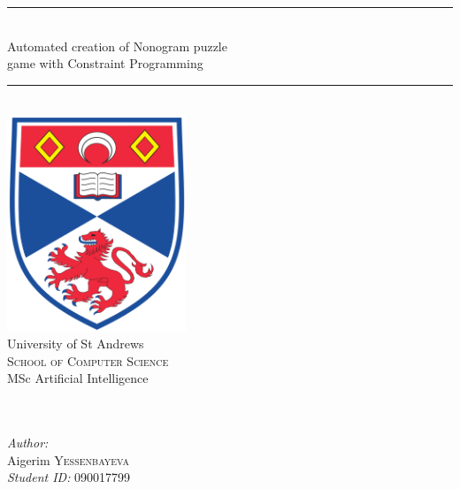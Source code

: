 \begin{titlingpage}
\newcommand{\HRule}{\rule{\linewidth}{0.5mm}} 
\center %
\HRule \\[0.5cm]
{ \huge Automated creation of Nonogram puzzle}\\[0.4cm]
{ \huge game with Constraint Programming}\\[0.3cm] %
\HRule \\[1.5cm]
\includegraphics[width= 0.4\textwidth]{UniversityStAndrews}\\[1cm] 
{ \huge University of St Andrews}\\[0.4cm] %
\textsc{\Large School of Computer Science}\\[0.4cm] %
\Large MSc Artificial Intelligence\\%
~\\~\\\begin{minipage}{0.4\textwidth}
    \begin{flushleft} \large
        \emph{Author:}\\
        Aigerim \textsc{Yessenbayeva}\\%
        \emph{Student ID:} 
        \textsc{090017799}\\%

\end{flushleft}
\end{minipage}
\end{titlingpage}
